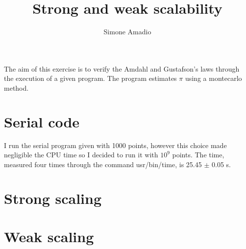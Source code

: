 \documentclass[10pt,a4paper]{article}
\begin{document}
\author{Simone Amadio}
\title{Strong and weak scalability}	
\date{} 
\maketitle

The aim of this exercise is to verify the Amdahl and Gustafson's laws through the execution of a given program. The program estimates $\pi$ using a montecarlo method. 

\section{Serial code}

I run the serial program given with 1000 points, however this choice made negligible the CPU time so I decided to run it with $10^9$ points. The time, measured four times through the command usr/bin/time, is 25.45 $\pm$  0.05 s. 
\section{Strong scaling}


\section{Weak scaling}
\end{document}
